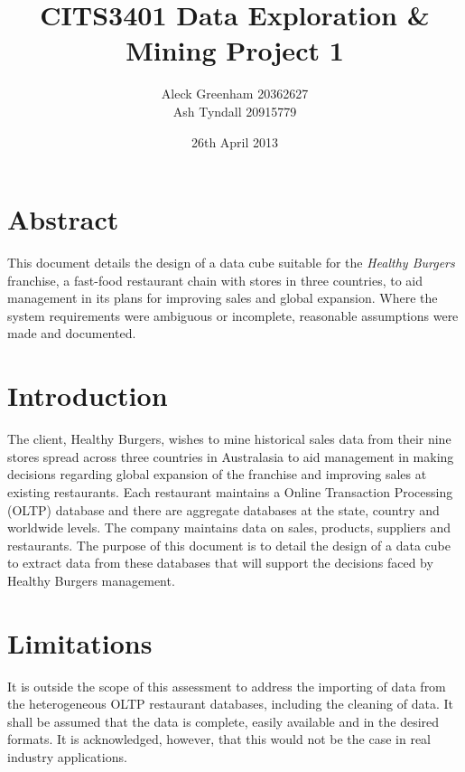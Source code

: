 \documentclass[11pt, a4paper]{article}
\newcommand{\subtitle}[1]{%
  \posttitle{%
    \par\end{center}
    \begin{center}\large#1\end{center}
    \vskip0.5em}%
}
\begin{document}
\title{CITS3401 Data Exploration \& Mining Project 1}
\subtitle{Healthy Burgers Fast Food Chain}
\author{Aleck Greenham 20362627 \\ Ash Tyndall 20915779}
\date{26th April 2013}

\maketitle

\section*{Abstract}

This document details the design of a data cube suitable for the \textit{Healthy Burgers} franchise, a fast-food restaurant chain with stores in three countries, to aid management in its plans for improving sales and global expansion. Where the system requirements \cite{designdoc} were ambiguous or incomplete, reasonable assumptions were made and documented.

\section*{Introduction}

The client, Healthy Burgers, wishes to mine historical sales data from their nine stores spread across three countries in Australasia to aid management in making decisions regarding global expansion of the franchise and improving sales at existing restaurants. Each restaurant maintains a Online Transaction Processing (OLTP) database and there are aggregate databases at the state, country and worldwide levels. The company maintains data on sales, products, suppliers and restaurants. The purpose of this document is to detail the design of a data cube to extract data from these databases that will support the decisions faced by Healthy Burgers management.

\section*{Limitations}

It is outside the scope of this assessment to address the importing of data from the heterogeneous OLTP restaurant databases, including the cleaning of data. It shall be assumed that the data is complete, easily available and in the desired formats. It is acknowledged, however, that this would not be the case in real industry applications.
\end{document}
